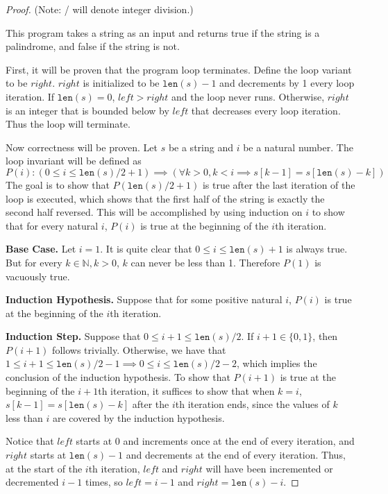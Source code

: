 \documentclass[11pt]{article}
\begin{document}
    \begin{proof}
        (Note: / will denote integer division.)

        This program takes a string as an input and returns true if the string is a palindrome, and false if the string is not.

        First, it will be proven that the program loop terminates. Define the loop variant to be \(right\). \(right\) is initialized to be \(\texttt{len}(s) -1\) and decrements by 1 every loop iteration. If \(\texttt{len}(s) = 0\), \(left > right\) and the loop never runs. Otherwise, \(right\) is an integer that is bounded below by \(left\) that decreases every loop iteration. Thus the loop will terminate.

        Now correctness will be proven. Let \(s\) be a string and \(i\) be a natural number. The loop invariant will be defined as
        \[
            P(i) \colon (0 \leq i \leq \texttt{len} (s)/2 + 1) \implies (\forall k > 0, k < i \implies s[k-1] = s[\texttt{len} (s) - k])
        \]
        The goal is to show that \(P(\texttt{len}(s)/2+1)\) is true after the last iteration of the loop is executed, which shows that the first half of the string is exactly the second half reversed. This will be accomplished by using induction on \(i\) to show that for every natural \(i\), \(P(i)\) is true at the beginning of the \(i\)th iteration.

        \textbf{Base Case.} Let \(i=1\). It is quite clear that \(0 \leq i \leq \texttt{len}(s)+1\) is always true. But for every \(k \in \mathbb{N}, k > 0\), \(k\) can never be less than 1. Therefore \(P(1)\) is vacuously true.

        \textbf{Induction Hypothesis.} Suppose that for some positive natural \(i\), \(P(i)\) is true at the beginning of the \(i\)th iteration.

        \textbf{Induction Step.} Suppose that \(0 \leq i+1 \leq \texttt{len}(s)/2\). If \(i+1 \in \{0, 1\}\), then \(P(i+1)\) follows trivially. Otherwise, we have that \(1 \leq i+1 \leq \texttt{len}(s)/2-1 \implies 0 \leq i \leq \texttt{len}(s) /2 -2\), which implies the conclusion of the induction hypothesis. To show that \(P(i+1)\) is true at the beginning of the \(i+1\)th iteration, it suffices to show that when \(k=i\), \(s[k-1]=s[\texttt{len}(s) - k]\) after the \(i\)th iteration ends, since the values of \(k\) less than \(i\) are covered by the induction hypothesis.

        Notice that \(left\) starts at 0 and increments once at the end of every iteration, and \(right\) starts at \(\texttt{len}(s) -1\) and decrements at the end of every iteration. Thus, at the start of the \(i\)th iteration, \(left\) and \(right\) will have been incremented or decremented \(i-1\) times, so \(left=i-1\) and \(right=\texttt{len}(s) - i\).


\end{proof}
\end{document}
